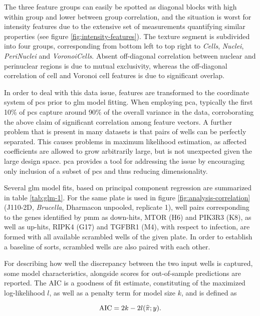The three feature groups can easily be spotted as diagonal blocks with high within group and lower between group correlation, and the situation is worst for intensity features due to the extensive set of measurements quantifying similar properties (see figure \ref{fig:intensity-features}). The texture segment is subdivided into four groups, corresponding from bottom left to top right to \textit{Cells}, \textit{Nuclei}, \textit{PeriNuclei} and \textit{VoronoiCells}. Absent off-diagonal correlation between nuclear and perinuclear regions is due to mutual exclusivity, whereas the off-diagonal correlation of cell and Voronoi cell features is due to significant overlap.



In order to deal with this data issue, features are transformed to the coordinate system of \glspl{pc} prior to \gls{glm} model fitting. When employing \gls{pca}, typically the first 10\% of \glspl{pc} capture around 90\% of the overall variance in the data, corroborating the above claim of significant correlation among feature vectors. A further problem that is present in many datasets is that pairs of wells can be perfectly separated. This causes problems in maximum likelihood estimation, as affected coefficients are allowed to grow arbitrarily large, but is not unexpected given the large design space. \Gls{pca} provides a tool for addressing the issue by encouraging only inclusion of a subset of \glspl{pc} and thus reducing dimensionality.

Several \gls{glm} model fits, based on principal component regression are summarized in table \ref{tab:glm-1}. For the same plate is used in figure \ref{fig:analysis-correlation} (J110-2D, \textit{Brucella}, Dharmacon unpooled, replicate 1), well pairs corresponding to the genes identified by \gls{pmm} as down-hits, MTOR (H6) and PIK3R3 (K8), as well as up-hits, RIPK4 (G17) and TGFBR1 (M4), with respect to infection, are formed with all available scrambled wells of the given plate. In order to establish a baseline of sorts, scrambled wells are also paired with each other.

For describing how well the discrepancy between the two input wells is captured, some model characteristics, alongside scores for out-of-sample predictions are reported. The AIC is a goodness of fit estimate, constituting of the maximized log-likelihood $l$, as well as a penalty term for model size $k$, and is defined as

\begin{equation}
  \operatorname{AIC} = 2k - 2l(\widehat{\pi}; y).
\end{equation}

